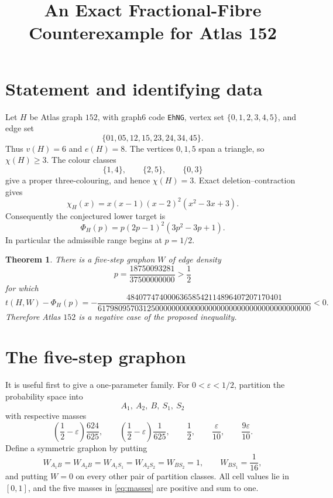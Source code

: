 \documentclass[11pt]{article}
\newtheorem{theorem}{Theorem}
\begin{document}
\title{An Exact Fractional-Fibre Counterexample for Atlas 152}
\author{}
\date{}
\maketitle

\section{Statement and identifying data}

Let $H$ be Atlas graph $152$, with graph6 code \texttt{EhNG}, vertex set
$\{0,1,2,3,4,5\}$, and edge set
\[
 \{01,05,12,15,23,24,34,45\}.
\]
Thus $v(H)=6$ and $e(H)=8$.  The vertices $0,1,5$ span a triangle, so
$\chi(H)\geq3$.  The colour classes
\[
 \{1,4\},\qquad \{2,5\},\qquad \{0,3\}
\]
give a proper three-colouring, and hence $\chi(H)=3$.  Exact
deletion--contraction gives
\begin{equation}
 \chi_H(x)=x(x-1)(x-2)^2(x^2-3x+3).
 \label{eq:chromatic-polynomial}
\end{equation}
Consequently the conjectured lower target is
\begin{equation}
 \Phi_H(p)=p(2p-1)^2(3p^2-3p+1).
 \label{eq:target}
\end{equation}
In particular the admissible range begins at $p=1/2$.

\begin{theorem}
There is a five-step graphon $W$ of edge density
\[
 p=\frac{18750093281}{37500000000}>\frac12
\]
for which
\[
 t(H,W)-\Phi_H(p)
 =-
 \frac{48407747400063658542114896407207170401}
 {6179809570312500000000000000000000000000000000000000}<0.
\]
Therefore Atlas $152$ is a negative case of the proposed inequality.
\end{theorem}

\section{The five-step graphon}

It is useful first to give a one-parameter family.  For
$0<\varepsilon<1/2$, partition the probability space into
\[
 A_1,\ A_2,\ B,\ S_1,\ S_2
\]
with respective masses
\begin{equation}
 \left(\frac12-\varepsilon\right)\frac{624}{625},\qquad
 \left(\frac12-\varepsilon\right)\frac1{625},\qquad
 \frac12,\qquad \frac{\varepsilon}{10},\qquad
 \frac{9\varepsilon}{10}.
 \label{eq:masses}
\end{equation}
Define a symmetric graphon by putting
\begin{equation}
 W_{A_1B}=W_{A_2B}=W_{A_1S_1}=W_{A_2S_2}=W_{BS_2}=1,
 \qquad W_{BS_1}=\frac1{16},
 \label{eq:cells}
\end{equation}
and putting $W=0$ on every other pair of partition classes.  All cell
values lie in $[0,1]$, and the five masses in \eqref{eq:masses} are positive
and sum to one.
\end{document}
